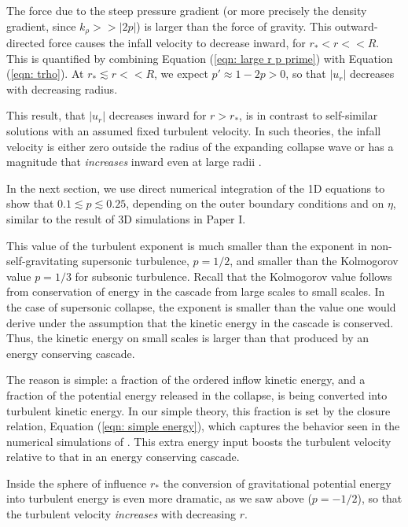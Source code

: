\documentclass[iop,apj,numberedappendix]{emulateapj}
\newcommand       \etaeff       {\eta}
\begin{document}
The force due to the steep pressure gradient (or more precisely the
density gradient, since $k_\rho >> |2p|$) is larger than the force of
gravity.  This outward-directed force causes the infall velocity to
decrease inward, for $r_*<r<<R$. This is quantified by combining
Equation (\ref{eqn: large r p prime}) with Equation (\ref{eqn: trho}). At
$r_*\lesssim r<<R$, we expect $p'\approx1-2p>0$, so that $|u_r|$
decreases with decreasing radius.

This result, that $|u_r|$ decreases inward for $r>r_*$, is in contrast to
self-similar solutions with an assumed fixed turbulent velocity. In
such theories, the infall velocity is either zero outside the radius
of the expanding collapse wave \citep{1977ApJ...214..488S,2003ApJ...585..850M} or has
a magnitude that {\em increases} inward even at large radii
\citep{2004ApJ...615..813F}.

In the next section, we use direct numerical integration of the 1D
equations to show that $0.1\lesssim p\lesssim0.25$, depending on the
outer boundary conditions and on $\etaeff$, similar to the result of
3D simulations in Paper I.

This value of the turbulent exponent is much smaller than the exponent
in non-self-gravitating supersonic turbulence, $p=1/2$, and smaller
than the Kolmogorov value $p=1/3$ for subsonic turbulence. Recall that
the Kolmogorov value follows from conservation of energy in the
cascade from large scales to small scales. In the case of supersonic
collapse, the exponent is smaller than the value one would derive
under the assumption that the kinetic energy in the cascade is
conserved. Thus, the kinetic energy on small scales is larger than
that produced by an energy conserving cascade. 

The reason is simple: a fraction of the ordered inflow kinetic energy,
and a fraction of the potential energy released in the collapse, is
being converted into turbulent kinetic energy. In our simple theory,
this fraction is set by the closure relation, Equation (\ref{eqn: simple
  energy}), which captures the behavior seen in the numerical
simulations of \citet{2012ApJ...750L..31R}. This extra energy input
boosts the turbulent velocity relative to that in an energy conserving
cascade.

Inside the sphere of influence $r_*$ the conversion of gravitational
potential energy into turbulent energy is even more dramatic, as we
saw above ($p=-1/2$), so that the turbulent velocity {\em increases} with
decreasing $r$.
\end{document}
